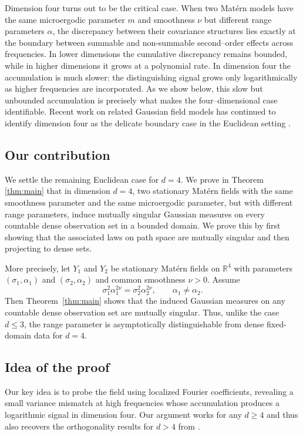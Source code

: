 \documentclass[11pt, reqno]{amsart}
\theoremstyle{remark}
\newcommand{\R}{\mathbb{R}}
\newcommand{\1}{\mathbf{1}}
\begin{document}
Dimension four turns out to be the critical case. When two Mat\'ern models
have the same microergodic parameter $m$ and smoothness $\nu$ but different
range parameters $\alpha$, the discrepancy between their covariance
structures lies exactly at the boundary between summable and non-summable
second–order effects across frequencies. In lower dimensions the cumulative
discrepancy remains bounded, while in higher dimensions it grows at a
polynomial rate. In dimension four the accumulation is much slower: the
distinguishing signal grows only logarithmically as higher frequencies are
incorporated. As we show below, this slow but unbounded accumulation is
precisely what makes the four–dimensional case identifiable.
Recent work on related Gaussian field models has continued to identify
dimension four as the delicate boundary case in the Euclidean setting
\citep{porcu2024matern, BoliKirc2023, li2023inference}.

\subsection{Our contribution}

We settle the remaining Euclidean case for $d = 4$.
We prove in Theorem \ref{thm:main} that in dimension $d=4$, two stationary Mat\'ern fields with the
same smoothness parameter and the same microergodic parameter, but with
different range parameters, induce mutually singular Gaussian measures on
every countable dense observation set in a bounded domain.
We prove this by first showing that the associated laws on path space are mutually singular and then projecting to dense sets.

More precisely, let $Y_1$ and $Y_2$ be stationary Mat\'ern fields on $\R^4$
with parameters $(\sigma_1,\alpha_1)$ and $(\sigma_2,\alpha_2)$ and common
smoothness $\nu>0$.
Assume
\begin{equation} \label{eqn:merg}
\sigma_1^2\alpha_1^{2\nu}=\sigma_2^2\alpha_2^{2\nu},
\qquad
\alpha_1\neq\alpha_2.
\end{equation}
Then Theorem~\ref{thm:main} shows that the induced Gaussian measures on any
countable dense observation set are mutually singular.
Thus, unlike the case $d\le 3$, the range parameter is asymptotically
distinguishable from dense fixed-domain data for $d = 4$.

\subsection{Idea of the proof}
Our key idea is to probe the field using localized Fourier coefficients, revealing a small variance mismatch at high frequencies whose accumulation produces a logarithmic signal in dimension four.
Our argument works for any $d \geq 4$ and thus also recovers the orthogonality results for $d > 4$ from \citet{Anderes2010}.
\end{document}
